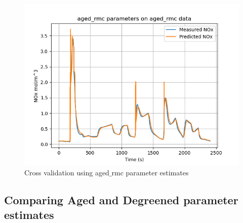 \begin{figure}[H]
\begin{minipage}{0.3\textwidth}
                \includegraphics[width = \textwidth]{./figs/figs_new_mdl/aged_rmc_aged_rmc.png}
        \end{minipage}
        \caption{Cross validation using aged$\_$rmc parameter estimates}
\end{figure}


\subsection{Comparing Aged and Degreened parameter estimates}

